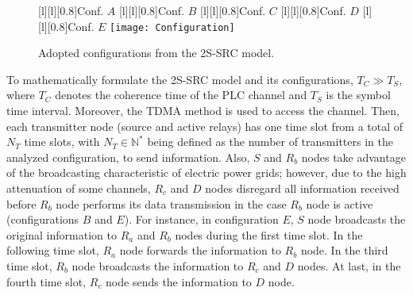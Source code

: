 \begin{figure}[h]
	\centering
	[l][0.8]{Conf. $A$}
	[l][0.8]{Conf. $B$}
	[l][0.8]{Conf. $C$}
	[l][0.8]{Conf. $D$}
	[l][0.8]{Conf. $E$}
	\texttt{[image: Configuration]}
	\caption{Adopted configurations from the 2S-SRC model.}
	\label{fig:configurations}
\end{figure}

To mathematically formulate the \ac{2S-SRC} model and its configurations, $T_{C} \gg T_{S}$, where $ T_{C} $ denotes the coherence time of the \ac{PLC} channel and $ T_{S} $ is the symbol time interval. Moreover, the \ac{TDMA} method is used to access the channel. Then, each transmitter node (source and active relays) has one time slot from a total of $N_{T}$ time slots, with $N_{T} \in \mathbb{N}^* $ being defined as the number of transmitters in the analyzed configuration, to send information. Also, $S$ and $R_b$ nodes take advantage of the broadcasting characteristic of electric power grids; however, due to the high attenuation of some channels, $R_c$ and $D$ nodes disregard all information received before $R_b$ node performs its data transmission in the case $R_b$ node is active (configurations $B$ and $E$). For instance, in configuration $E$, $S$ node broadcasts the original information to $R_{a}$ and $R_{b}$ nodes during the first time slot. In the following time slot, $R_{a}$ node forwards the information to $R_{b}$ node. In the third time slot, $R_{b}$ node broadcasts the information to $R_{c}$ and $D$ nodes. At last, in the fourth time slot, $R_{c}$ node sends the information to $D$ node.

